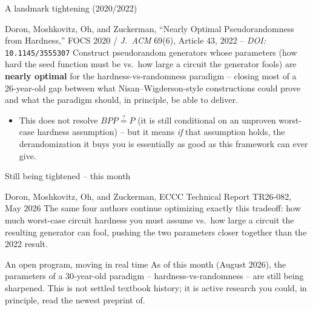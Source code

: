 \documentclass[11pt,aspectratio=169]{beamer}
\begin{document}
\begin{frame}{A landmark tightening (2020/2022)}
  \begin{block}{Doron, Moshkovitz, Oh, and Zuckerman, ``Nearly Optimal Pseudorandomness
  from Hardness,'' FOCS 2020 / \emph{J.\ ACM} 69(6), Article 43, 2022 --
  \emph{DOI:} \texttt{10.1145/3555307}}
    Construct pseudorandom generators whose parameters (how hard the seed function must
    be vs.\ how large a circuit the generator fools) are \textbf{nearly optimal} for the
    hardness-vs-randomness paradigm -- closing most of a 26-year-old gap between what
    Nisan--Wigderson-style constructions could prove and what the paradigm should, in
    principle, be able to deliver.
  \end{block}
  \begin{itemize}
    \item This does not resolve $BPP \stackrel{?}{=} P$ (it is still conditional on an
    unproven worst-case hardness assumption) -- but it means \emph{if} that assumption
    holds, the derandomization it buys you is essentially as good as this framework can
    ever give.
  \end{itemize}
\end{frame}

\begin{frame}{Still being tightened -- this month}
  \begin{block}{Doron, Moshkovitz, Oh, and Zuckerman, ECCC Technical Report TR26-082,
  May 2026}
    The same four authors continue optimizing exactly this tradeoff: how much
    worst-case circuit hardness you must assume vs.\ how large a circuit the resulting
    generator can fool, pushing the two parameters closer together than the 2022 result.
  \end{block}
  \begin{alertblock}{An open program, moving in real time}
    As of this month (August 2026), the parameters of a 30-year-old paradigm --
    hardness-vs-randomness -- are still being sharpened. This is not settled
    textbook history; it is active research you could, in principle, read the newest
    preprint of.
  \end{alertblock}
\end{frame}
\end{document}
